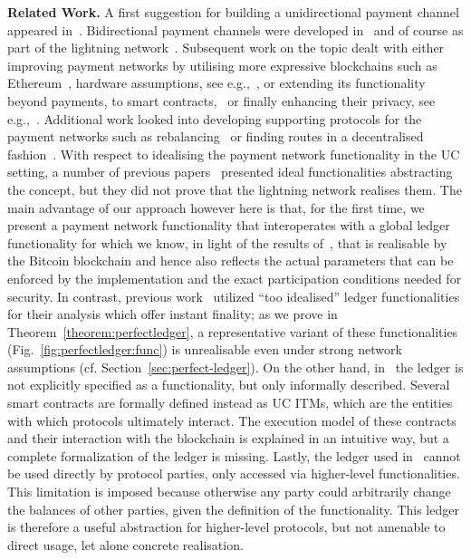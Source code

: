 \noindent \textbf{Related Work.} A first suggestion for building a
unidirectional payment channel appeared in~\cite{spilman}. Bidirectional payment
channels were developed in~\cite{DBLP:conf/sss/DeckerW15} and of course as part
of the lightning network~\cite{lightning}. Subsequent work on the topic dealt
with either improving payment networks by utilising more expressive blockchains
such as Ethereum~\cite{perun}, hardware assumptions, see
e.g.,~\cite{DBLP:conf/systor/LindNEKPS18}, or extending its functionality beyond
payments, to smart contracts,~\cite{sprites} or finally enhancing their privacy,
see
e.g.,~\cite{Malavolta:2017:CPP:3133956.3134096,DBLP:conf/ccs/0001M17,DBLP:conf/ndss/HeilmanABSG17}.
Additional work looked into developing supporting protocols for the payment
networks such as rebalancing~\cite{DBLP:conf/ccs/KhalilG17} or finding routes in
a decentralised fashion~\cite{flare,spider}. With respect to idealising the
payment network functionality in the UC setting, a number of previous
papers~\cite{DBLP:conf/ccs/DziembowskiFH18,Malavolta:2017:CPP:3133956.3134096,sprites,perun}
presented ideal functionalities abstracting the concept, but they did not prove
that the lightning network realises them. The main advantage of our approach
however here is that, for the first time, we present a payment network
functionality that interoperates with a global ledger functionality for which we
know, in light of the results of~\cite{BMTZ17}, that is realisable by the
Bitcoin blockchain and hence also reflects the actual parameters that can be
enforced by the implementation and the exact participation conditions needed for
security. In contrast, previous
work~\cite{DBLP:conf/ccs/DziembowskiFH18,Malavolta:2017:CPP:3133956.3134096,perun}
utilized ``too idealised'' ledger functionalities for their analysis which offer
instant finality; as we prove in Theorem~\ref{theorem:perfectledger}, a
representative variant of these functionalities
(Fig.~\ref{fig:perfectledger:func}) is unrealisable even under strong network
assumptions (cf. Section~\ref{sec:perfect-ledger}). On the other hand,
in~\cite{sprites} the ledger is not explicitly specified as a functionality, but
only informally described. Several smart contracts are formally defined instead
as UC ITMs, which are the entities with which protocols ultimately interact. The
execution model of these contracts and their interaction with the blockchain is
explained in an intuitive way, but a complete formalization of the ledger is
missing. Lastly, the ledger used in~\cite{DBLP:conf/ccs/DziembowskiFH18} cannot
be used directly by protocol parties, only accessed via higher-level
functionalities. This limitation is imposed because otherwise any party could
arbitrarily change the balances of other parties, given the definition of the
functionality. This ledger is therefore a useful abstraction for higher-level
protocols, but not amenable to direct usage, let alone concrete realisation.

